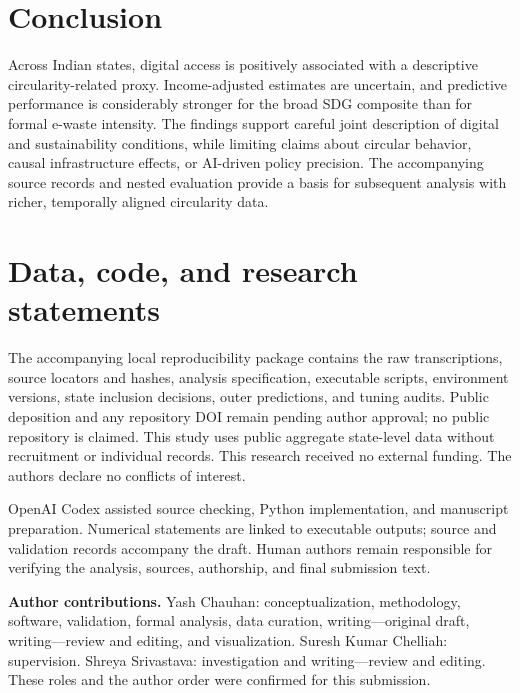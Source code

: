 \documentclass[11pt,a4paper]{article}
\begin{document}
\section{Conclusion}
Across \SampleN{} Indian states, digital access is positively associated with a descriptive circularity-related proxy. Income-adjusted estimates are uncertain, and predictive performance is considerably stronger for the broad SDG composite than for formal e-waste intensity. The findings support careful joint description of digital and sustainability conditions, while limiting claims about circular behavior, causal infrastructure effects, or AI-driven policy precision. The accompanying source records and nested evaluation provide a basis for subsequent analysis with richer, temporally aligned circularity data.

\section*{Data, code, and research statements}
The accompanying local reproducibility package contains the raw transcriptions, source locators and hashes, analysis specification, executable scripts, environment versions, state inclusion decisions, outer predictions, and tuning audits. Public deposition and any repository DOI remain pending author approval; no public repository is claimed. This study uses public aggregate state-level data without recruitment or individual records. This research received no external funding. The authors declare no conflicts of interest.

OpenAI Codex assisted source checking, Python implementation, and manuscript preparation. Numerical statements are linked to executable outputs; source and validation records accompany the draft. Human authors remain responsible for verifying the analysis, sources, authorship, and final submission text.

\textbf{Author contributions.} Yash Chauhan: conceptualization, methodology, software, validation, formal analysis, data curation, writing---original draft, writing---review and editing, and visualization. Suresh Kumar Chelliah: supervision. Shreya Srivastava: investigation and writing---review and editing. These roles and the author order were confirmed for this submission.
\end{document}
